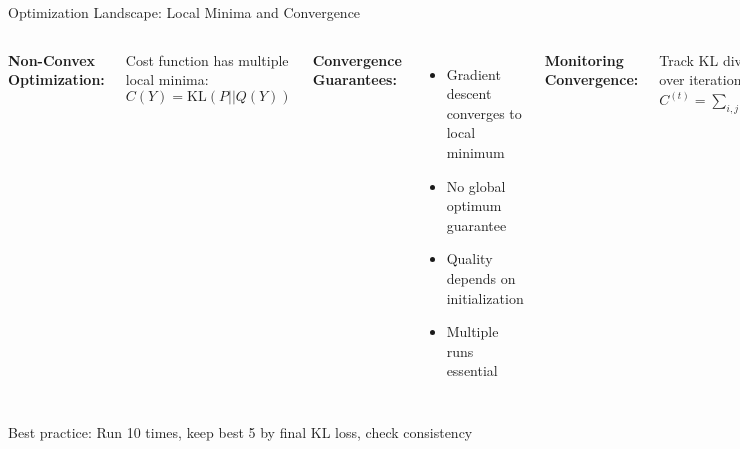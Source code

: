 \documentclass[aspectratio=169]{beamer}
\begin{document}
\begin{frame}{Optimization Landscape: Local Minima and Convergence}
\begin{columns}
\textbf{Non-Convex Optimization:}

Cost function has multiple local minima:
$C(Y) = \text{KL}(P||Q(Y))$

\textbf{Convergence Guarantees:}
\begin{itemize}
\item Gradient descent converges to local minimum
\item No global optimum guarantee
\item Quality depends on initialization
\item Multiple runs essential
\end{itemize}

\textbf{Monitoring Convergence:}

Track KL divergence over iterations:
$C^{(t)} = \sum_{i,j} p_{ij}\log\frac{p_{ij}}{q_{ij}^{(t)}}$

Converged when: $|C^{(t)} - C^{(t-100)}| < \epsilon$


\vspace{0.2cm}
\textbf{Practical Indicators:}
\begin{itemize}
\item Plateau in loss: likely converged
\item Still decreasing: run longer
\item Oscillating: reduce learning rate
\item Diverging: major problem
\end{itemize}
\end{columns}

\vspace{0.3cm}
\colorbox{green!20}{\parbox{0.95\textwidth}{\centering Best practice: Run 10 times, keep best 5 by final KL loss, check consistency}}
\end{frame}
\end{document}
